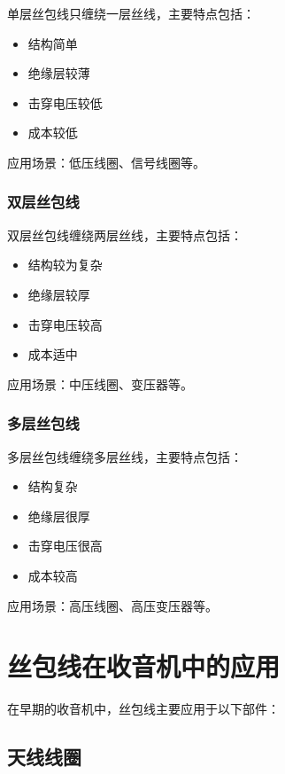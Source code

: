 \documentclass[12pt,UTF8]{ctexbook}
\begin{document}
单层丝包线只缠绕一层丝线，主要特点包括：

\begin{itemize}[leftmargin=2cm]
    \item 结构简单
    \item 绝缘层较薄
    \item 击穿电压较低
    \item 成本较低
\end{itemize}

应用场景：低压线圈、信号线圈等。

\subsubsection{双层丝包线}

双层丝包线缠绕两层丝线，主要特点包括：

\begin{itemize}[leftmargin=2cm]
    \item 结构较为复杂
    \item 绝缘层较厚
    \item 击穿电压较高
    \item 成本适中
\end{itemize}

应用场景：中压线圈、变压器等。

\subsubsection{多层丝包线}

多层丝包线缠绕多层丝线，主要特点包括：

\begin{itemize}[leftmargin=2cm]
    \item 结构复杂
    \item 绝缘层很厚
    \item 击穿电压很高
    \item 成本较高
\end{itemize}

应用场景：高压线圈、高压变压器等。

\section{丝包线在收音机中的应用}

在早期的收音机中，丝包线主要应用于以下部件：

\subsection{天线线圈}
\end{document}
